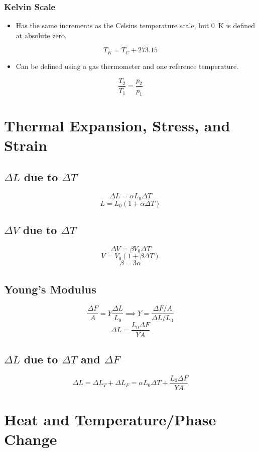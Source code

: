 \documentclass{article}
\begin{document}
\subsubsection{Kelvin Scale}

\begin{itemize}
    \item Has the same increments as the Celsius temperature scale, but \SI{0}{\kelvin} is defined at absolute zero. 
\end{itemize}
\[T_K=T_C+273.15\]
\begin{itemize}
    \item Can be defined using a gas thermometer and one reference temperature. 
\end{itemize}
\[\frac{T_2}{T_1}=\frac{p_2}{p_1}\]

\section{Thermal Expansion, Stress, and Strain}

\subsection{$\Delta L$ due to $\Delta T$}
\[\Delta L = \alpha L_0 \Delta T\]
\[L=L_0(1+\alpha\Delta T)\]

\subsection{$\Delta V$ due to $\Delta T$}
\[\Delta V = \beta V_0 \Delta T\]
\[V = V_0(1 + \beta \Delta T)\]
\[\beta = 3\alpha\]

\subsection{Young's Modulus}
\[\frac{\Delta F}{A}=Y\frac{\Delta L}{L_0} \implies Y = \frac{\Delta F/A}{\Delta L/L_0}\]
\[\Delta L = \frac{L_0\Delta F}{YA}\]

\subsection{$\Delta L$ due to $\Delta T$ and $\Delta F$}
\[\Delta L = \Delta L_T + \Delta L_F = \alpha L_0\Delta T + \frac{L_0\Delta F}{YA}\]

\section{Heat and Temperature/Phase Change}
\end{document}
